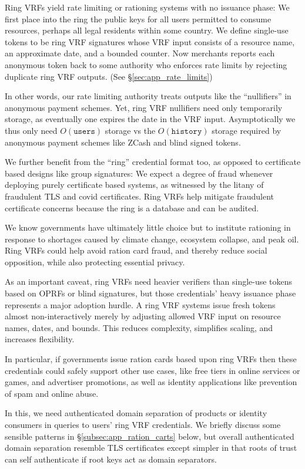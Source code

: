 Ring VRFs yield rate limiting or rationing systems with no issuance phase:\quad 
We first place into the ring the public keys for all users permitted to
consume resources, perhaps all legal residents within some country.  
We define single-use tokens to be ring VRF signatures whose VRF input
consists of a resource name, an approximate date, and a bounded counter.
Now merchants reports each anonymous token back to some authority who
enforces rate limits by rejecting duplicate ring VRF outputs.
(See \S\ref{sec:app_rate_limits})

In other words, our rate limiting authority treats outputs like the
``nullifiers'' in anonymous payment schemes.
Yet, ring VRF nullifiers need only temporarily storage, as eventually one
expires the date in the VRF input.  Asymptotically we thus only need
$O(\mathtt{users})$ storage vs the $O(\mathtt{history})$ storage
required by anonymous payment schemes like ZCash and blind signed tokens.

We further benefit from the ``ring'' credential format too,
 as opposed to certificate based designs like group signatures:\quad 
We expect a degree of fraud whenever deploying purely certificate
based systems, as witnessed by the litany of fraudulent TLS and covid
certificates.  Ring VRFs help mitigate fraudulent certificate concerns
because the ring is a database and can be audited.

We know governments have ultimately little choice but to institute
rationing in response to shortages caused by climate change, ecosystem
collapse, and peak oil.  Ring VRFs could help avoid ration card fraud,
and thereby reduce social opposition, while also protecting essential privacy.

As an important caveat, ring VRFs need heavier verifiers than single-use
tokens based on OPRFs \cite{PrivacyPass} or blind signatures, but
those credentials' heavy issuance phase represents a major adoption hurdle.
A ring VRF systems issue fresh tokens almost non-interactively merely by
adjusting allowed VRF input on resource names, dates, and bounds.
This reduces complexity, simplifies scaling, and increases flexibility.

In particular, if governments issue ration cards based upon ring VRFs
then these credentials could safely support other use cases, like
free tiers in online services or games, and advertiser promotions,
as well as identity applications like prevention of spam and online abuse.

In this, we need authenticated domain separation of products or identity
consumers in queries to users' ring VRF credentials.  We briefly discuss
some sensible patterns in \S\ref{subsec:app_ration_carts} below, but
overall authenticated domain separation resemble TLS certificates except
simpler in that roots of trust can self authenticate if root keys act as
domain separators.

